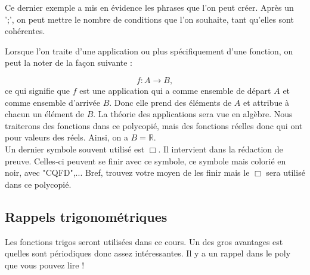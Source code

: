 \documentclass[a4paper, 12pt, french, twoside]{article}
\newcommand{\Rr}{{\mathbb{R}}}
\begin{document}
Ce dernier exemple a mis en évidence les phrases que l'on peut créer. Après un ';', on peut mettre le nombre de conditions que l'on souhaite, tant qu'elles sont cohérentes. 

Lorsque l'on traite d'une application ou plus spécifiquement d'une fonction, on peut la noter de la façon suivante :

\begin{equation}
    f: A \to B,
\end{equation}
ce qui signifie que $f$ est une application qui a comme ensemble de départ $A$ et comme ensemble d'arrivée $B$. Donc elle prend des éléments de $A$ et attribue à chacun un élément de $B$. La théorie des applications sera vue en algèbre. Nous traiterons des fonctions dans ce polycopié, mais des fonctions réelles donc qui ont pour valeurs des réels. Ainsi, on a $B=\Rr$.\\

Un dernier symbole souvent utilisé est $\Box$. Il intervient dans la rédaction de preuve. Celles-ci peuvent se finir avec ce symbole, ce symbole mais colorié en noir, avec "CQFD",... Bref, trouvez votre moyen de les finir mais le $\Box$ sera utilisé dans ce polycopié.

\subsection{Rappels trigonométriques}

Les fonctions trigos seront utilisées dans ce cours. Un des gros avantages est quelles sont périodiques donc assez intéressantes. Il y a un rappel dans le poly que vous pouvez lire !




\end{document}
